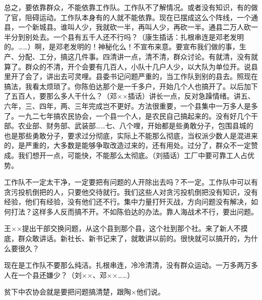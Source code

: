 总之，要依靠群众，不能依靠工作队。工作队不了解情况。或者没有知识，有的做了官，阻碍运动。工作队本身有的人就不能依靠。现在已摆成这么个阵线，一个通县，一个新城县。谁叫人少，我就砍一半，再叫人少，再砍一半。通县二万人砍一半分到别处去。一个县有五千人还不行吗？（康生插话：扎根串连是邓老发明的。……）啊，是邓老发明的！神秘化么！不宣布来意。要宣布我们做的事，生产、分配、工分，搞这几件事。四清讲一点，清不清，群众讨论。有就清，没有就算了。群众的不清，开个会要有几百人，小队十几户人少，以大队为单位开。说县里开了会了，讲出去可灵哩。县委书记问题严重的，当工作队到别的县去。照现在搞法，我看太烦琐了。你陈伯达那个是一千多户，开始几个人也搞开了。以后加下了五百人，要那么多人干什么？（邓××插话）讲长一点，反对急躁情绪。讲五、六年，三、四年，两、三年完成岂不更好。方法很重要，一个县集中一万多人是多了。一九二七年搞农民协会，一个县一个人，是农民自己搞起来的。没有好几个干部。农业部、财务部、武装部……七、八个哩，开始都是些勇敢分子，包围县城的也是那些勇敢分子，要求过分彻底，实际上不能那么彻底，当权派少数人是混进来的，是严重的，大多数是能够争取改造过来的，还有用处。过分了，群众不一定赞成。我们想开一点，可能快，不能那么太彻底。（刘插话）工厂中要可靠工人占优势。

工作队不一定太干净，一定要把有问题的人开除出去吗？不一定。工作队中可以有贪污投机倒把的人，只要他交待就行。我们这些人对贪污投机倒把没有知识，没有经验，他们有经验，没有他们还不行。集中力量打歼灭战，方向问题没有解决，如何打法？这样多人反而搞不开。不如陈伯达的办法。靠人海战术不行，要出问题。

王××提出干部交换问题，从这个县到那个县，这个社到那个社。来了新人不摸底，群众敢讲话。新社长、新书记来了，就敢讲以前的。很快就可以搞开的，为什么要很久？

现在是工作队不要那么纯洁。扎根串连，冷冷清清，没有群众运动。一万多两万多人在一个县还嫌少？（刘××、邓××……）

贫下中农协会就是要把问题搞清楚，跟陶×他们说。


